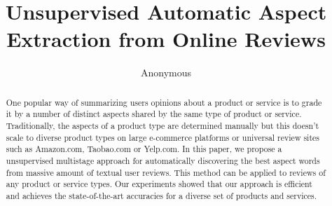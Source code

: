 \documentclass[conference]{IEEEtran}
\title{Unsupervised Automatic Aspect Extraction from Online Reviews}
\author{Anonymous}
\begin{document}
\maketitle

\begin{abstract}
One popular way of summarizing users opinions about a product or
service is to grade it by a number of distinct aspects 
shared by the same type of product or service.
Traditionally, the aspects of a product type are determined manually
but this doesn't scale to diverse product types on large
e-commerce platforms or universal review sites such as Amazon.com, Taobao.com
or Yelp.com.
In this paper, we propose a unsupervised multistage 
approach for automatically discovering the best aspect words from massive
amount of textual user reviews. This method can be applied to reviews of
any product or service types. Our experiments showed that our approach
is efficient and achieves the state-of-the-art accuracies for a diverse
set of products and services. 
\end{abstract}







\end{document}

